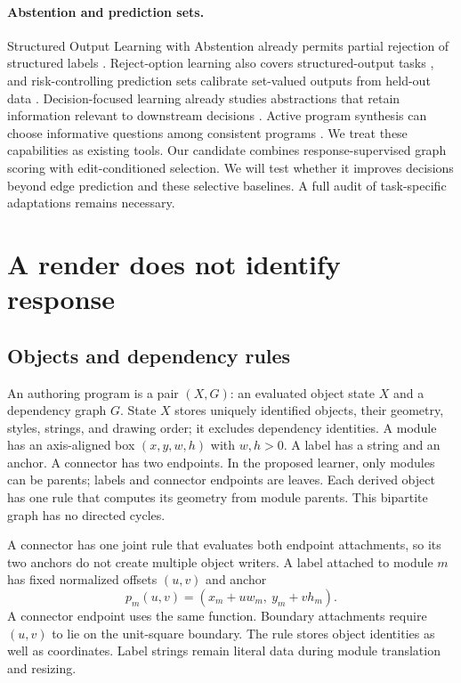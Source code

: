 \documentclass{article}
\begin{document}
\paragraph{Abstention and prediction sets.}
Structured Output Learning with Abstention already permits partial rejection of structured labels \citep{garcia2018sola}. Reject-option learning also covers structured-output tasks \citep{franc2023reject}, and risk-controlling prediction sets calibrate set-valued outputs from held-out data \citep{bates2021rcps}. Decision-focused learning already studies abstractions that retain information relevant to downstream decisions \citep{poli2023ideal}. Active program synthesis can choose informative questions among consistent programs \citep{tiwari2020significant}. We treat these capabilities as existing tools. Our candidate combines response-supervised graph scoring with edit-conditioned selection. We will test whether it improves decisions beyond edge prediction and these selective baselines. A full audit of task-specific adaptations remains necessary.

\section{A render does not identify response}
\subsection{Objects and dependency rules}
An authoring program is a pair $(X,G)$: an evaluated object state $X$ and a dependency graph $G$. State $X$ stores uniquely identified objects, their geometry, styles, strings, and drawing order; it excludes dependency identities. A module has an axis-aligned box $(x,y,w,h)$ with $w,h>0$. A label has a string and an anchor. A connector has two endpoints. In the proposed learner, only modules can be parents; labels and connector endpoints are leaves. Each derived object has one rule that computes its geometry from module parents. This bipartite graph has no directed cycles.

A connector has one joint rule that evaluates both endpoint attachments, so its two anchors do not create multiple object writers. A label attached to module $m$ has fixed normalized offsets $(u,v)$ and anchor
\begin{equation}
 p_m(u,v)=(x_m+u w_m,\ y_m+v h_m).
\end{equation}
A connector endpoint uses the same function. Boundary attachments require $(u,v)$ to lie on the unit-square boundary. The rule stores object identities as well as coordinates. Label strings remain literal data during module translation and resizing.
\end{document}
